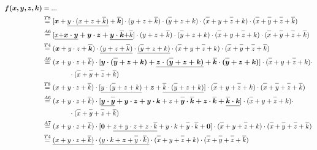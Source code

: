 \documentclass{article}
\newcommand*{\oline}[1]{\overline{#1\mathstrut}}
\newcommand{\bigspace}{\quad\quad\quad\quad}
\begin{document}
\newpage

\begin{align*}
  \bm{f(x,y,z,k)} &= ...\\
  &\overset{T8}{=} [\bm{x} + \underline{y \cdot (x+z+\oline{k})} + \bm{\oline{k}}] \cdot (y+z+\oline{k}) \cdot (\oline{y}+z+k) \cdot (\oline{x}+y+\oline{z}+k) \cdot (\oline{x}+\oline{y}+\oline{z}+\oline{k})\\
  &\overset{A6}{=} [\underline{x\vphantom{y} + }\bm{\underline{x \cdot y} + y \cdot z + \underline{y \cdot \oline{k}}}\underline{ + \oline{k}}] \cdot (y+z+\oline{k}) \cdot (\oline{y}+z+k) \cdot (\oline{x}+y+\oline{z}+k) \cdot (\oline{x}+\oline{y}+\oline{z}+\oline{k})\\
  &\overset{T4}{=} (\bm{x} + y \cdot z + \bm{\oline{k}}) \cdot \underline{(y+z+\oline{k})} \cdot \underline{(\oline{y}+z+k)} \cdot (\oline{x}+y+\oline{z}+k) \cdot (\oline{x}+\oline{y}+\oline{z}+\oline{k})\\
  &\overset{A6}{=} (x + y \cdot z + \oline{k}) \cdot [\bm{y \cdot (\oline{y}+z+k) + \underline{z \cdot (\oline{y}+z+k)} + \oline{k} \cdot (\oline{y}+z+k)}] \cdot (\oline{x}+y+\oline{z}+k) \cdot\\
  &\bigspace \cdot (\oline{x}+\oline{y}+\oline{z}+\oline{k})\\
  &\overset{T8}{=} (x + y \cdot z + \oline{k}) \cdot [\underline{y \cdot (\oline{y}+z+k)} + \bm{z} + \underline{\oline{k} \cdot (\oline{y}+z+k)}] \cdot (\oline{x}+y+\oline{z}+k) \cdot (\oline{x}+\oline{y}+\oline{z}+\oline{k})\\
  &\overset{A6}{=} (x + y \cdot z + \oline{k}) \cdot [\bm{\underline{y \cdot \oline{y}} + y \cdot z + y \cdot k} + z + \bm{\oline{y} \cdot \oline{k} + z \cdot \oline{k} + \underline{\oline{k} \cdot k}}] \cdot (\oline{x}+y+\oline{z}+k) \cdot\\
  &\bigspace \cdot (\oline{x}+\oline{y}+\oline{z}+\oline{k})\\
  &\overset{A7}{=} (x + y \cdot z + \oline{k}) \cdot [\bm{0} + \underline{z + y \cdot z + z \cdot \oline{k}} + y \cdot k + \oline{y} \cdot \oline{k} + \bm{0}] \cdot (\oline{x}+y+\oline{z}+k) \cdot (\oline{x}+\oline{y}+\oline{z}+\oline{k})\\
  &\overset{T4}{=} \underline{(x + y \cdot z + \oline{k})} \cdot \underline{(y \cdot k + \bm{z} + \oline{y} \cdot \oline{k})} \cdot (\oline{x}+y+\oline{z}+k) \cdot (\oline{x}+\oline{y}+\oline{z}+\oline{k})\\

\end{align*}
\end{document}
